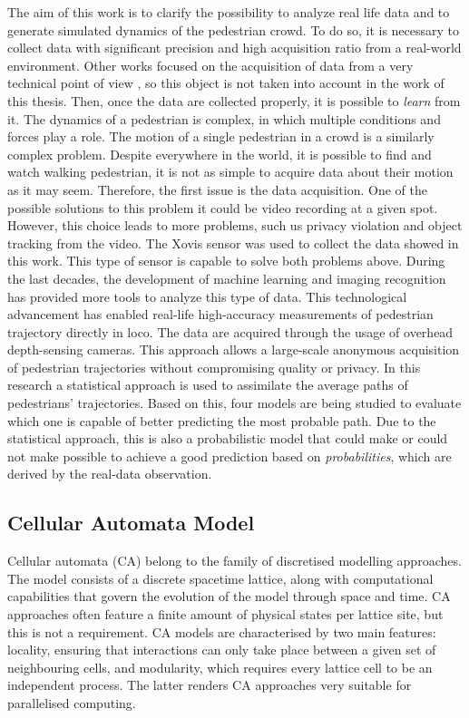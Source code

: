 \documentclass[class=article, crop=false]{standalone}
\begin{document}
The aim of this work is to clarify the possibility to analyze real life data and to generate simulated dynamics of the pedestrian crowd. 
To do so, it is necessary to collect data with significant precision and high acquisition ratio from a real-world environment. 
Other works focused on the acquisition of data from a very technical point of view \cite{alecorbe}, so this object is not taken into account in the work of this thesis.
Then, once the data are collected properly, it is possible to \emph{learn} from it. 
The dynamics of a pedestrian is complex, in which multiple conditions and forces play a role. 
The motion of a single pedestrian in a crowd is a similarly complex problem. 
Despite everywhere in the world, it is possible to find and watch walking pedestrian, it is not as simple to acquire data about their motion as it may seem. 
Therefore, the first issue is the data acquisition. 
One of the possible solutions to this problem it could be video recording at a given spot. 
However, this choice leads to more problems, such us privacy violation and object tracking from the video. 
The Xovis sensor \cite{Xovis} was used to collect the data showed in this work. 
This type of sensor is capable to solve both problems above. During the last decades, the development of machine learning and imaging recognition has provided more tools to analyze this type of data. 
This technological advancement has enabled real-life high-accuracy measurements of pedestrian trajectory directly in loco. 
The data are acquired through the usage of overhead depth-sensing cameras. 
This approach allows a large-scale anonymous acquisition of pedestrian trajectories without compromising quality or privacy. 
In this research a statistical approach is used to assimilate the average paths of pedestrians’ trajectories. 
Based on this, four models are being studied to evaluate which one is capable of better predicting the most probable path. 
Due to the statistical approach, this is also a probabilistic model that could make or could not make possible to achieve a good prediction based on \emph{probabilities}, which are derived by the real-data observation.


\subsection{Cellular Automata Model}
Cellular automata (CA) belong to the family of discretised modelling approaches. The model consists of a discrete spacetime lattice, along with computational capabilities that govern the evolution of the model through space and time. CA approaches often feature a finite amount of physical states per lattice site, but this is not a requirement. CA models are characterised by two main features: locality, ensuring that interactions can only take place between a given set of neighbouring cells, and modularity, which requires every lattice cell to be an independent process. The latter renders CA approaches very suitable for parallelised computing.
\end{document}
